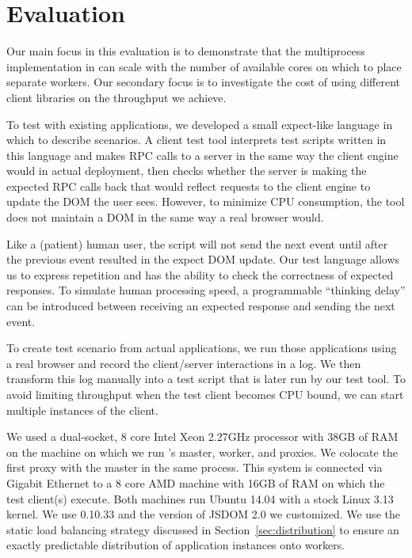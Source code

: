 \chapter{Evaluation}


Our main focus in this evaluation is to demonstrate that the multiprocess implementation
in \cbtwo can scale with the number of available cores on which to place separate workers.
Our secondary focus is to investigate the cost of using different client libraries on 
the throughput we achieve.

To test \cbtwo with existing applications, we developed a small expect-like language 
in which to describe scenarios. A client test tool interprets test scripts written in
this language and makes RPC calls to a server in the same way the client engine would
in actual deployment, then checks whether the server is making the expected RPC
calls back that would reflect requests to the client engine to update the DOM the
user sees.  
However, to minimize CPU consumption, the tool does not maintain a DOM in the same
way a real browser would.

Like a (patient) human user, the script will not send the next event until after the
previous event resulted in the expect DOM update.  
Our test language allows us to express repetition and has the ability to check
the correctness of expected responses.  
To simulate human processing speed, a programmable ``thinking delay'' can be introduced 
between receiving an expected response and sending the next event.

To create test scenario from actual applications,
we run those applications using a real browser and record the client/server interactions
in a log.  We then transform this log manually into a test script that is later run 
by our test tool.  To avoid limiting throughput when the test client becomes CPU bound,
we can start multiple instances of the client.

We used a dual-socket, 8 core Intel Xeon 2.27GHz processor with 38GB of RAM on the machine
on which we run \cbtwo{}'s master, worker, and proxies.  We colocate the first proxy with
the master in the same process.
This system is connected via Gigabit Ethernet to a 8 core AMD
machine with 16GB of RAM on which the test client(s) execute. Both machines run 
Ubuntu 14.04 with a stock Linux 3.13 kernel.  We use \nodejs{} 0.10.33 and the version
of JSDOM 2.0 we customized.  We use the static load balancing strategy discussed in 
Section~\ref{sec:distribution} to ensure an exactly predictable distribution of application
instances onto workers.

